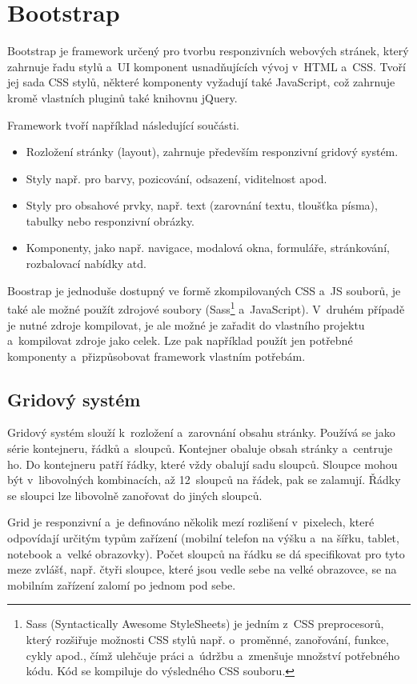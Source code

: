 \documentclass[
  digital, %
  oneside, %
  table,   %
  nolof,     %
  nolot,     %
]{fithesis3}
\begin{document}
\section{Bootstrap}
Bootstrap je framework určený pro tvorbu responzivních webových stránek, který zahrnuje řadu stylů a~UI komponent usnadňujících vývoj v~HTML a~CSS. Tvoří jej sada CSS stylů, některé komponenty vyžadují také JavaScript, což zahrnuje kromě vlastních pluginů také knihovnu jQuery.\par
Framework tvoří například následující součásti. \cite{bootstrapcom}
\begin{itemize}
  \item Rozložení stránky (layout), zahrnuje především responzivní gridový systém.
  \item Styly např. pro barvy, pozicování, odsazení, viditelnost apod.
  \item Styly pro obsahové prvky, např. text (zarovnání textu, tloušťka písma), tabulky nebo responzivní obrázky. 
  \item Komponenty, jako např. navigace, modalová okna, formuláře, stránkování, rozbalovací nabídky atd.
\end{itemize}
Boostrap je jednoduše dostupný ve formě zkompilovaných CSS a~JS souborů, je také ale možné použít zdrojové soubory (Sass\footnote{Sass (Syntactically Awesome StyleSheets) je jedním z~CSS preprocesorů, který rozšiřuje možnosti CSS stylů např. o~proměnné, zanořování, funkce, cykly apod., čímž ulehčuje práci a~údržbu a~zmenšuje množství potřebného kódu. Kód se kompiluje do výsledného CSS souboru.} a~JavaScript). V~druhém případě je nutné zdroje kompilovat, je ale možné je zařadit do vlastního projektu a~kompilovat zdroje jako celek. Lze pak například použít jen potřebné komponenty a~přizpůsobovat framework vlastním potřebám.

\subsection{Gridový systém}
Gridový systém slouží k~rozložení a~zarovnání obsahu stránky. Používá se jako série kontejneru, řádků a~sloupců. \cite{bootstrapcom} Kontejner obaluje obsah stránky a~centruje ho. Do kontejneru patří řádky, které vždy obalují sadu sloupců. Sloupce mohou být v~libovolných kombinacích, až 12~sloupců na řádek, pak se zalamují. Řádky se sloupci lze libovolně zanořovat do jiných sloupců.\par
Grid je responzivní a~je definováno několik mezí rozlišení v~pixel\-ech, které odpovídají určitým typům zařízení (mobilní telefon na výšku a~na šířku, tablet, notebook a~velké obrazovky). Počet sloupců na řádku se dá specifikovat pro tyto meze zvlášť, např. čtyři sloupce, které jsou vedle sebe na velké obrazovce, se na mobilním zařízení zalomí po jednom pod sebe.
\end{document}
